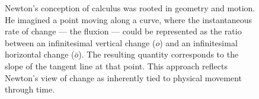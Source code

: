 \begin{figure}[H]
\centering
{}

\vspace{0.5em}
\caption{\small Newton's conception of calculus was rooted in geometry and motion. He imagined a point moving along a curve, where the instantaneous rate of change — the fluxion — could be represented as the ratio between an infinitesimal vertical change ($o$) and an infinitesimal horizontal change ($\bar{o}$). The resulting quantity corresponds to the slope of the tangent line at that point. This approach reflects Newton’s view of change as inherently tied to physical movement through time.}
\end{figure}



